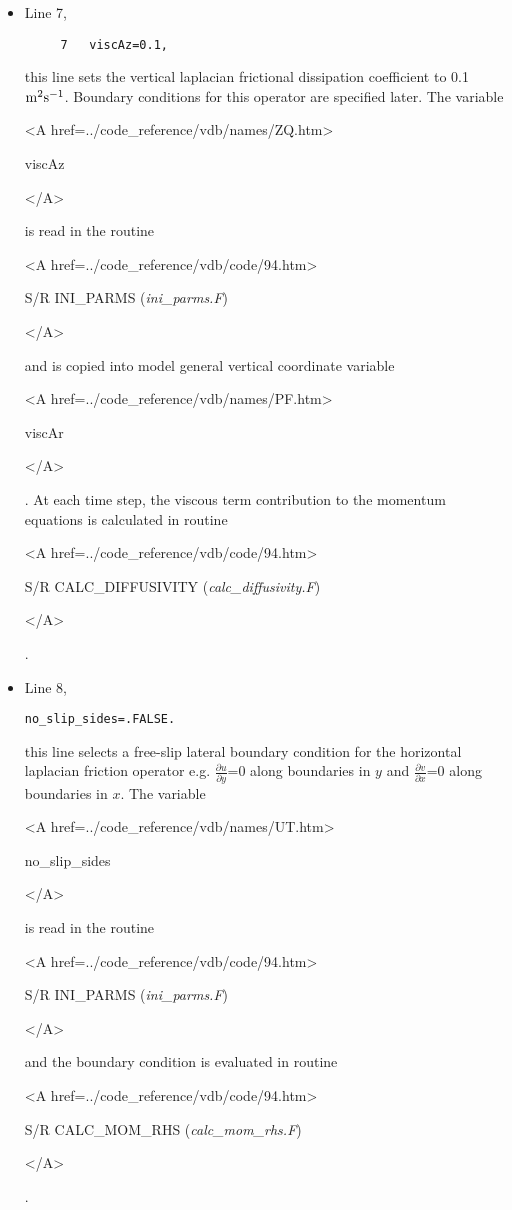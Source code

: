 \begin{itemize}
\item Line 7,
\begin{verbatim}
     7   viscAz=0.1,
\end{verbatim}
this line sets the vertical laplacian frictional dissipation coefficient to
0.1 ${\rm m^{2}s^{-1}}$. Boundary conditions
for this operator are specified later.
The variable 
{\bf 
\begin{rawhtml} <A href=../code_reference/vdb/names/ZQ.htm> \end{rawhtml}
viscAz
\begin{rawhtml} </A>\end{rawhtml}
}
is read in the routine
{\it
\begin{rawhtml} <A href=../code_reference/vdb/code/94.htm> \end{rawhtml}
S/R INI\_PARMS ({\it ini\_parms.F})
\begin{rawhtml} </A>\end{rawhtml}
}
and is copied into model general vertical coordinate variable 
{\bf 
\begin{rawhtml} <A href=../code_reference/vdb/names/PF.htm> \end{rawhtml}
viscAr
\begin{rawhtml} </A>\end{rawhtml}
}. At each time step, the viscous term contribution to the momentum equations
is calculated in routine
{\it 
\begin{rawhtml} <A href=../code_reference/vdb/code/94.htm> \end{rawhtml}
S/R CALC\_DIFFUSIVITY ({\it calc\_diffusivity.F})
\begin{rawhtml} </A>\end{rawhtml}
}.


\item Line 8,
\begin{verbatim}
no_slip_sides=.FALSE.
\end{verbatim}
this line selects a free-slip lateral boundary condition for
the horizontal laplacian friction operator 
e.g. $\frac{\partial u}{\partial y}$=0 along boundaries in $y$ and
$\frac{\partial v}{\partial x}$=0 along boundaries in $x$.
The variable
{\bf
\begin{rawhtml} <A href=../code_reference/vdb/names/UT.htm> \end{rawhtml}
no\_slip\_sides
\begin{rawhtml} </A>\end{rawhtml}
}
is read in the routine
{\it
\begin{rawhtml} <A href=../code_reference/vdb/code/94.htm> \end{rawhtml}
S/R INI\_PARMS ({\it ini\_parms.F})
\begin{rawhtml} </A>\end{rawhtml}
} and the boundary condition is evaluated in routine
{\it 
\begin{rawhtml} <A href=../code_reference/vdb/code/94.htm> \end{rawhtml}
S/R CALC\_MOM\_RHS ({\it calc\_mom\_rhs.F})
\begin{rawhtml} </A>\end{rawhtml}
}.



\end{itemize}
